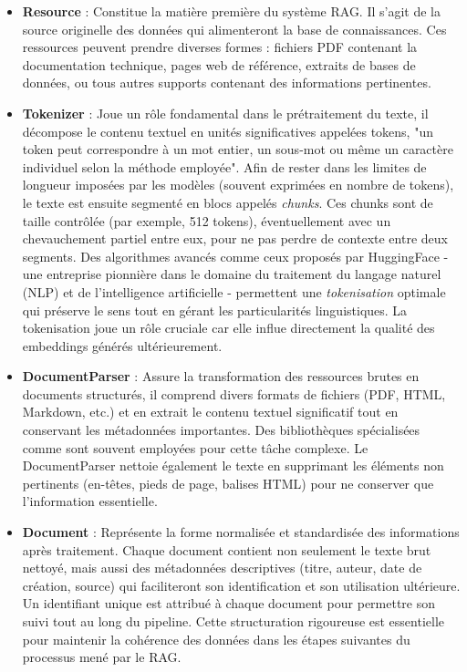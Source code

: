 \documentclass[12pt,a4paper]{report}
\begin{document}
	\begin{itemize}
		
		\item \textbf{Resource} : Constitue la matière première du système RAG. Il s'agit de la source originelle des données qui alimenteront la base de connaissances. Ces ressources peuvent prendre diverses formes : fichiers PDF contenant la documentation technique, pages web de référence, extraits de bases de données, ou tous autres supports contenant des informations pertinentes.
		
		\item \textbf{Tokenizer} : Joue un rôle fondamental dans le prétraitement du texte, il  décompose le contenu textuel en unités significatives appelées tokens, "un token peut correspondre à un mot entier, un sous-mot ou même un caractère individuel selon la méthode employée". Afin de rester dans les limites de longueur imposées par les modèles (souvent exprimées en nombre de tokens), le texte est ensuite segmenté en blocs appelés \textit{chunks}. Ces chunks sont de taille contrôlée (par exemple, 512 tokens), éventuellement avec un chevauchement partiel entre eux, pour ne pas perdre de contexte entre deux segments. Des algorithmes avancés comme ceux proposés par HuggingFace - une entreprise pionnière dans le domaine du traitement du langage naturel (NLP) et de l’intelligence artificielle - permettent une \textit{tokenisation} optimale qui préserve le sens tout en gérant les particularités linguistiques. La tokenisation joue un rôle cruciale car elle influe directement la qualité des embeddings générés ultérieurement.
		
		\item \textbf{DocumentParser} : Assure la transformation des ressources brutes en documents structurés, il comprend divers formats de fichiers (PDF, HTML, Markdown, etc.) et en extrait le contenu textuel significatif tout en conservant les métadonnées importantes. Des bibliothèques spécialisées comme sont souvent employées pour cette tâche complexe. Le DocumentParser nettoie également le texte en supprimant les éléments non pertinents (en-têtes, pieds de page, balises HTML) pour ne conserver que l'information essentielle.
		
		\item \textbf{Document} : Représente la forme normalisée et standardisée des informations après traitement. Chaque document contient non seulement le texte brut nettoyé, mais aussi des métadonnées descriptives (titre, auteur, date de création, source) qui faciliteront son identification et son utilisation ultérieure. Un identifiant unique est attribué à chaque document pour permettre son suivi tout au long du pipeline. Cette structuration rigoureuse est essentielle pour maintenir la cohérence des données dans les étapes suivantes du processus mené par le RAG.
		

\end{itemize}
\end{document}
